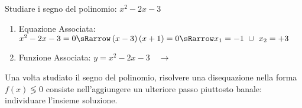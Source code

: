 \begin{esempio}
Studiare i segno del polinomio: \(x^2-2x-3\)

\begin{enumerate}
 \item
  Equazione Associata:~\(x^2-2x-3=0 \sRarrow
                        \left(x-3 \right)\left(x+1\right)=0 \sRarrow
                        x_1=-1~\cup~x_2=+3\)
 \item
  \begin{minipage}{.45\textwidth}
  Funzione Associata: \(y = x^2-2x-3 \quad \rightarrow\)
  \end{minipage}
  \begin{minipage}{.30\textwidth}
  \end{minipage}
\end{enumerate}

\end{esempio}

Una volta studiato il segno del polinomio, risolvere una disequazione nella
forma \(f(x) \lessgtr 0\) consiste nell'aggiungere un ulteriore passo
piuttosto banale: individuare l'insieme soluzione.

